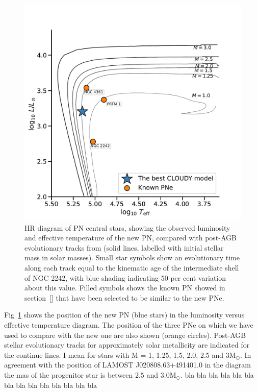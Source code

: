 \documentclass[fleqn,usenatbib]{mnras}
\begin{document}
{\begin{figure}
\centering
  \includegraphics[width=\linewidth]{Figs/hr-planetarieNebula}
  \caption{HR diagram of PN central stars, showing the observed luminosity
and effective temperature of the new PN, compared with
post-AGB evolutionary tracks from \citet{Miller:2016} (solid lines,
labelled with initial stellar mass in solar masses). Small star symbols show
an evolutionary time along each track equal to the kinematic age of the
intermediate shell of NGC 2242, with blue shading indicating 50 per cent
variation about this value. Filled symbols shows the known PN showed in section~\ref{}
that have been selected to be similar to the new PNe.} 
 \label{fig:track-evolutive}
\end{figure}

Fig~\ref{fig:track-evolutive} shows the position of the new PN (blue stars) in the luminosity
versus effective temperature diagram. The position of the three PNe on which we have used to
compare with the new one are also shown (orange circles). Post-AGB stellar evolutionary tracks for
approximately solar metallicity \citep{Miller:2016} are indicated for the continue lines.
I mean for stars with M = 1, 1.25, 1.5, 2.0, 2.5 and 3M$_{\odot}$. In agreement with the
position of LAMOST J020808.63+491401.0 in the diagram the mas of the progenitor star is
between 2.5 and 3.0M$_{\odot}$. {\sc bla bla bla bla bla bla bla bla bla bla bla bla bla bla}
}
\end{document}
